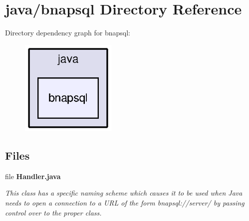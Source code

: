 \section{java/bnapsql Directory Reference}
\label{dir_c4905ed7953f88dc206fb38741b9f54b}
Directory dependency graph for bnapsql\+:\nopagebreak
\begin{figure}[H]
\begin{center}
\leavevmode
\includegraphics[width=130pt]{dir_c4905ed7953f88dc206fb38741b9f54b_dep}
\end{center}
\end{figure}
\subsection*{Files}
\begin{DoxyCompactItemize}
\item 
file {\bf Handler.\+java}
\begin{DoxyCompactList}\small\item\em This class has a specific naming scheme which causes it to be used when Java needs to open a connection to a U\+R\+L of the form bnapsql\+://server/ by passing control over to the proper class. \end{DoxyCompactList}\end{DoxyCompactItemize}
